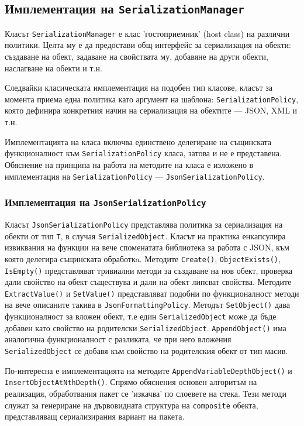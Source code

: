 \documentclass[12pt,a4paper,oneside]{book}
\begin{document}
\subsection{Имплементация на \texttt{SerializationManager}}

Класът \texttt{SerializationManager} е клас 'гостоприемник' (host class)
на различни политики.  Целта му е да предостави общ интерфейс за сериализация
на обекти: създаване на обект, задаване на свойствата му,
добавяне на други обекти, наслагване на обекти и т.н.

Следвайки класическата имплементация на подобен тип класове, класът за момента
приема една политика като аргумент на шаблона: \texttt{SerializationPolicy},
която дефинира конкретния начин на сериализация на обектите --- JSON, XML и т.н.

Имплементацията на класа включва единствено делегиране на същинската
функционалност към
\texttt{SerializationPolicy} класа, затова и не е представена. Обяснение на
принципа на работа на методите на класа е изложено в
имплементация на \texttt{SerializationPolicy} ---
\texttt{JsonSerializationPolicy}.

\subsubsection{Имплементация на \texttt{JsonSerializationPolicy}}

Класът \texttt{JsonSerializationPolicy} представлява политика за сериализация на
обекти от тип \texttt{T}, в случая \texttt{SerializedObject}. Класът на
практика енкапсулира извиквания на функции на вече споменатата
библиотека за работа с JSON, към която делегира същинската обработкa.
Методите \texttt{Create()}, \texttt{ObjectExists()}, \texttt{IsEmpty()}
представляват тривиални методи за създаване на нов обект, проверка дали
свойство на обект съществува и дали на обект липсват свойства. Методите
\texttt{ExtractValue()} и \texttt{SetValue()} представляват подобни по
функционалност методи на вече описаните такива в \texttt{JsonFormattingPolicy}.
Методът \texttt{SetObject()} дава функционалност за вложен обект, т.е един
\texttt{SerializedObject} може да бъде добавен като свойство на родителски
\texttt{SerializedObject}.  \texttt{AppendObject()} има аналогична
функционалност с разликата, че при него вложения \texttt{SerializedObject} се
добавя към свойство на родителския обект от тип масив.

По-интересна е имплементацията на методите \texttt{AppendVariableDepthObject()} и
\texttt{InsertObjectAtNthDepth()}. Спрямо обяснения основен алгоритъм на
реализация, обработвания пакет се 'изкачва' по слоевете на стека. Тези методи
служат за генериране на дървовидната структура на \texttt{composite} обекта,
представляващ сериализирания вариант на пакета.
\end{document}
